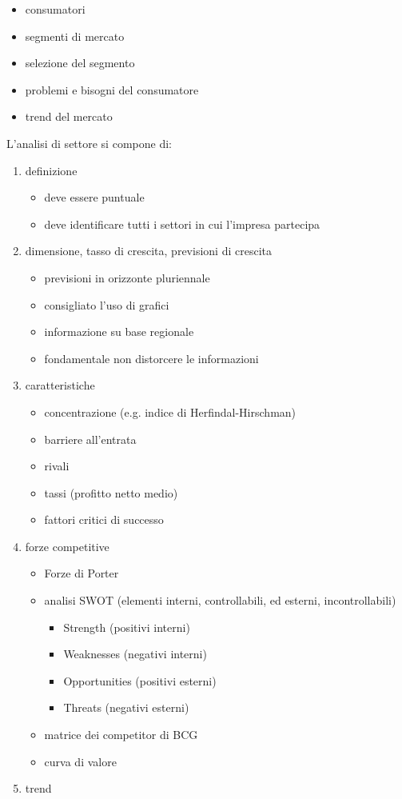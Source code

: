 \documentclass[answers, a4paper, 11pt]{exam}
\begin{document}
\begin{itemize}
    \item consumatori
    \item segmenti di mercato
    \item selezione del segmento
    \item problemi e bisogni del consumatore
    \item trend del mercato
\end{itemize}

L'analisi di settore si compone di:
\begin{enumerate}
    \item definizione
    \begin{itemize}
        \item deve essere puntuale
        \item deve identificare tutti i settori in cui l'impresa partecipa
    \end{itemize}
    \item dimensione, tasso di crescita, previsioni di crescita
    \begin{itemize}
        \item previsioni in orizzonte pluriennale
        \item consigliato l'uso di grafici
        \item informazione su base regionale
        \item fondamentale non distorcere le informazioni
    \end{itemize}
    \item caratteristiche
    \begin{itemize}
        \item concentrazione (e.g. indice di Herfindal-Hirschman)
        \item barriere all'entrata
        \item rivali
        \item tassi (profitto netto medio)
        \item fattori critici di successo
    \end{itemize}
    \item forze competitive
    \begin{itemize}
        \item Forze di Porter
        \item analisi SWOT (elementi interni, controllabili, ed esterni, incontrollabili)
        \begin{itemize}
            \item Strength (positivi interni)
            \item Weaknesses (negativi interni)
            \item Opportunities (positivi esterni)
            \item Threats (negativi esterni)
        \end{itemize}
        \item matrice dei competitor di BCG
        \item curva di valore
    \end{itemize}
    \item trend
\end{enumerate}
\end{document}
